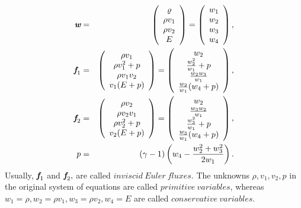 \begin{eqnarray}
{\textit{\textbf{w}}} & = & \left( \begin{array}{c} \varrho\\ \rho v_1\\ \rho v_2\\ E \end{array} \right) = \left( \begin{array}{c} w_1 \\ w_2 \\ w_3 \\ w_4 \\ \end{array} \right), \\
\label{f_1}
{\textit{\textbf{f}}}_1 & = & \left( \begin{array}{c} \rho v_1\\ \rho v_1^2 + p\\ \rho v_1 v_2\\ v_1(E+p) \end{array} \right) = \left( \begin{array}{c} w_2\\ \frac{w_2^2}{w_1} + p\\ \frac{w_2w_3}{w_1}\\ \frac{w_2}{w_1}(w_4+p) \end{array} \right), \\
\label{f_2}
{\textit{\textbf{f}}}_2 & = & \left( \begin{array}{c} \rho v_2\\ \rho v_2 v_1\\ \rho v_2^2 + p\\ v_2(E+p) \end{array} \right) = \left( \begin{array}{c} w_2\\ \frac{w_3w_2}{w_1}\\ \frac{w_3^2}{w_1} + p\\ \frac{w_3}{w_1}(w_4+p) \end{array} \right), \\
p & = & \left({\gamma - 1}\right) \left( w_4 - \frac{w_2^2 + w_3^2}{2w_1}\right).
\end{eqnarray}
Usually, ${\textit{\textbf{f}}}_1$ and ${\textit{\textbf{f}}}_2,$ are called $inviscid\ Euler\ fluxes$. The unknowns $\rho, v_1, v_2, p$ in the original system of equations are called $primitive\ variables$, whereas $w_1 = \rho, w_2 = \rho v_1, w_3 = \rho v_2, w_4 = E$ are called $conservative\ variables$.
